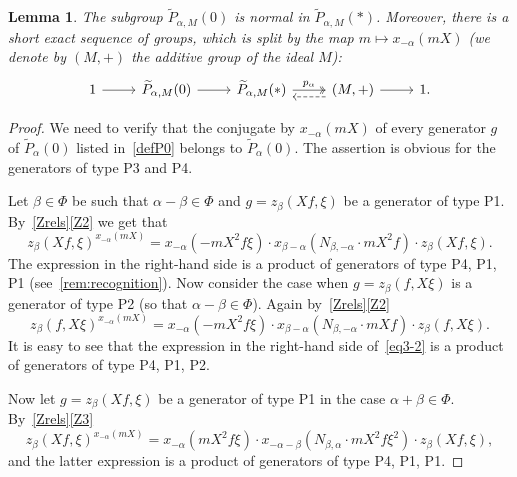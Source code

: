 \documentclass[10pt,a4paper,twoside]{article}
\newtheorem{lemma}{Lemma}
\theoremstyle{remark}
\theoremstyle{definition}
\numberwithin{lemma}{section}
\numberwithin{prop}{section}
\numberwithin{corollary}{section}
\numberwithin{externaltheorem}{section}
\numberwithin{equation}{section}
\begin{document}
\begin{lemma}\label{P0_normal} The subgroup $\widetilde{P}_{\alpha, M}(0)$ is normal in $\widetilde{P}_{\alpha, M}(*)$. Moreover, there is a short exact sequence of groups, which is split by the map $m \mapsto x_{-\alpha}(mX)$ (we denote by $(M, +)$ the additive group of the ideal $M$):
\[\begin{tikzcd} 1 \arrow{r} & \widetilde{P}_{\alpha,M}(0) \arrow{r} & \widetilde{P}_{\alpha,M}(*) \ar[r, "p_\alpha", twoheadrightarrow] & (M, +) \arrow[l, dashrightarrow, shift left=2] \arrow{r} & 1. \end{tikzcd} \] \end{lemma}
\begin{proof} We need to verify that the conjugate by $x_{-\alpha}(mX)$ of every generator $g$ of $\widetilde{P}_\alpha(0)$ listed in~\cref{defP0} belongs to $\widetilde{P}_\alpha(0)$.
The assertion is obvious for the generators of type P3 and P4.

Let $\beta\in\Phi$ be such that $\alpha - \beta \in \Phi$ and $g = z_\beta(Xf, \xi)$ be a generator of type P1. By~\cref{Zrels}\ref{Z2} we get that \begin{equation} z_{\beta}(Xf, \xi) ^ {x_{-\alpha}(mX)} =  x_{-\alpha} (- mX^2f\xi) \cdot x_{\beta-\alpha} (N_{\beta, -\alpha}\cdot mX^2f) \cdot z_{\beta}(Xf, \xi). \label{eq3-1} \end{equation}
The expression in the right-hand side is a product of generators of type P4, P1, P1 (see~\cref{rem:recognition}).
Now consider the case when $g = z_\beta(f, X\xi)$ is a generator of type P2 (so that $\alpha-\beta\in\Phi$). Again by~\cref{Zrels}\ref{Z2}
\begin{equation}
z_{\beta}(f, X\xi) ^ {x_{-\alpha}(mX)} =  x_{-\alpha} (- mX^2f\xi ) \cdot x_{\beta-\alpha} (N_{\beta, -\alpha}\cdot mXf) \cdot z_{\beta}(f, X\xi). \label{eq3-2} \end{equation}
It is easy to see that the expression in the right-hand side of~\eqref{eq3-2} is a product of generators of type P4, P1, P2.

Now let $g = z_{\beta}(Xf, \xi)$ be a generator of type P1 in the case $\alpha + \beta \in \Phi$. By~\cref{Zrels}\ref{Z3}
\begin{equation} \label{eq3-3} z_{\beta}(Xf, \xi) ^ {x_{-\alpha}(mX)} = x_{-\alpha} (mX^2f\xi ) \cdot x_{-\alpha-\beta} (N_{\beta,\alpha}\cdot mX^2f\xi^2) \cdot z_{\beta}(Xf, \xi), \end{equation}
and the latter expression is a product of generators of type P4, P1, P1.


\end{proof}
\end{document}
